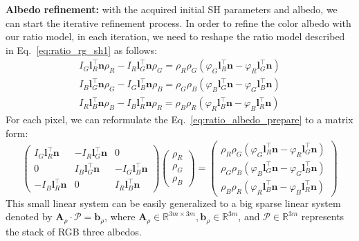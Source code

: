 \textbf{Albedo refinement:}
with the acquired initial SH parameters and albedo, we can start the iterative refinement process.
In order to refine the color albedo with our ratio model, in each iteration, we need to reshape the ratio model described in Eq.~\ref{eq:ratio_rg_sh1} as follows:
\begin{equation}\label{eq:ratio_albedo_prepare}
\begin{split}
I_G \mathbf{l}_R^\top\mathbf{n} \rho_R - I_R \mathbf{l}_G^\top\mathbf{n} \rho_G  = \rho_R \rho_G (\varphi_G\mathbf{l}_R^\top \mathbf{n} - \varphi_R\mathbf{l}_G^\top \mathbf{n})\\
I_B \mathbf{l}_G^\top\mathbf{n} \rho_G - I_G \mathbf{l}_B^\top\mathbf{n} \rho_B  = \rho_G \rho_B (\varphi_B\mathbf{l}_G^\top \mathbf{n} - \varphi_G\mathbf{l}_B^\top \mathbf{n})\\
I_R \mathbf{l}_B^\top\mathbf{n} \rho_B - I_B \mathbf{l}_R^\top\mathbf{n} \rho_R  = \rho_B \rho_R (\varphi_R\mathbf{l}_B^\top \mathbf{n} - \varphi_B\mathbf{l}_R^\top \mathbf{n})
\end{split}
\end{equation}
For each pixel, we can reformulate the Eq.~\ref{eq:ratio_albedo_prepare} to a matrix form:
\begin{equation}\label{eq:rho_matrix}
    \begin{pmatrix}
        I_G \mathbf{l}_R^\top\mathbf{n} & - I_R \mathbf{l}_G^\top\mathbf{n} & 0 \\
        0 & I_B \mathbf{l}_G^\top\mathbf{n} & - I_G \mathbf{l}_B^\top\mathbf{n} \\
        - I_B \mathbf{l}_R^\top\mathbf{n} & 0 & I_R \mathbf{l}_B^\top\mathbf{n} 
    \end{pmatrix}
    \begin{pmatrix}
        \rho_R\\
        \rho_G\\
        \rho_B
     \end{pmatrix}
    =
    \begin{pmatrix}
        \rho_R \rho_G (\varphi_G\mathbf{l}_R^\top \mathbf{n} - \varphi_R\mathbf{l}_G^\top \mathbf{n})\\
        \rho_G \rho_B (\varphi_B\mathbf{l}_G^\top \mathbf{n} - \varphi_G\mathbf{l}_B^\top \mathbf{n})\\
        \rho_B \rho_R (\varphi_R\mathbf{l}_B^\top \mathbf{n} - \varphi_B\mathbf{l}_R^\top \mathbf{n})
    \end{pmatrix}
\end{equation}
This small linear system can be easily generalized to a big sparse linear system denoted by $\mathbf{A}_{\rho}\cdot {\mathcal{P}} = \mathbf{b}_{\rho}$, where $\mathbf{A}_{\rho}\in\mathbb{R}^{3m\times3m}, \mathbf{b}_{\rho}\in\mathbb{R}^{3m}$, and $\mathcal{P} \in\mathbb{R}^{3m} $ represents the stack of RGB three albedos.


